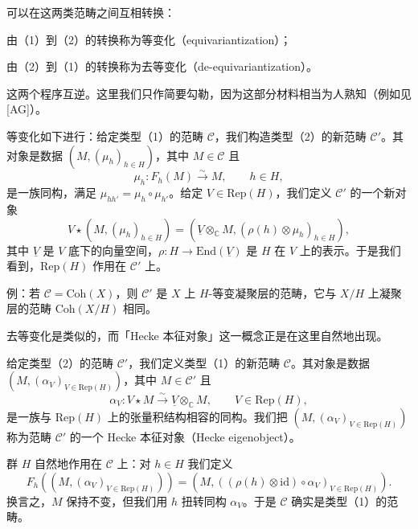 \documentclass[11pt,a4paper]{article}
\begin{document}
可以在这两类范畴之间互相转换：

由（1）到（2）的转换称为等变化（equivariantization）；

由（2）到（1）的转换称为去等变化（de-equivariantization）。

这两个程序互逆。这里我们只作简要勾勒，因为这部分材料相当为人熟知（例如见 [AG]）。


等变化如下进行：给定类型（1）的范畴 $\mathcal{C}$，我们构造类型（2）的新范畴 $\mathcal{C}'$。其对象是数据 $(M,(\mu_h)_{h\in H})$，其中 $M\in\mathcal{C}$ 且
\[
\mu_h : F_h(M)\xrightarrow{\sim} M,\qquad h\in H,
\]
是一族同构，满足 $\mu_{hh'} = \mu_h\circ\mu_{h'}$。给定 $V\in\mathrm{Rep}(H)$，我们定义 $\mathcal{C}'$ 的一个新对象
\[
V\star(M,(\mu_h)_{h\in H}) = (\underline{V}\otimes_{\mathbb{C}} M,(\rho(h)\otimes\mu_h)_{h\in H}),
\]
其中 $\underline{V}$ 是 $V$ 底下的向量空间，$\rho : H\to\mathrm{End}(\underline{V})$ 是 $H$ 在 $V$ 上的表示。于是我们看到，$\mathrm{Rep}(H)$ 作用在 $\mathcal{C}'$ 上。

例：若 $\mathcal{C} = \mathrm{Coh}(X)$，则 $\mathcal{C}'$ 是 $X$ 上 $H$-等变凝聚层的范畴，它与 $X/H$ 上凝聚层的范畴 $\mathrm{Coh}(X/H)$ 相同。

去等变化是类似的，而「Hecke 本征对象」这一概念正是在这里自然地出现。

给定类型（2）的范畴 $\mathcal{C}'$，我们定义类型（1）的新范畴 $\mathcal{C}$。其对象是数据 $(M,(\alpha_V)_{V\in\mathrm{Rep}(H)})$，其中 $M\in\mathcal{C}'$ 且
\begin{equation}\tag{6.1}
\alpha_V : V\star M\xrightarrow{\sim}\underline{V}\otimes_{\mathbb{C}} M,\qquad V\in\mathrm{Rep}(H),
\end{equation}
是一族与 $\mathrm{Rep}(H)$ 上的张量积结构相容的同构。我们把 $(M,(\alpha_V)_{V\in\mathrm{Rep}(H)})$ 称为范畴 $\mathcal{C}'$ 的一个 Hecke 本征对象（Hecke eigenobject）。


群 $H$ 自然地作用在 $\mathcal{C}$ 上：对 $h\in H$ 我们定义
\begin{equation}\tag{6.2}
F_h((M,(\alpha_V)_{V\in\mathrm{Rep}(H)})) = (M,((\rho(h)\otimes\mathrm{id})\circ\alpha_V)_{V\in\mathrm{Rep}(H)}).
\end{equation}
换言之，$M$ 保持不变，但我们用 $h$ 扭转同构 $\alpha_V$。于是 $\mathcal{C}$ 确实是类型（1）的范畴。
\end{document}
